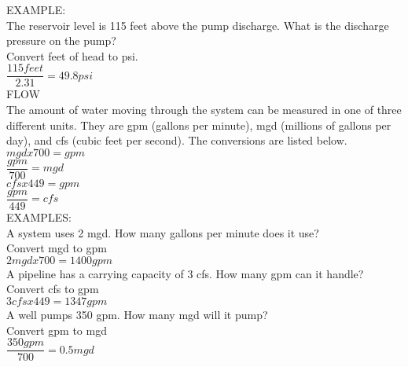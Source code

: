 \documentclass{article}
\begin{document}
EXAMPLE:\\
The reservoir level is 115 feet above the pump discharge. What is the discharge pressure on the pump?\\
Convert feet of head to psi.\\
$\dfrac{115 feet}{2.31} = 49.8 psi$\\


FLOW\\
The amount of water moving through the system can be measured in one of three different units. They are gpm (gallons per minute), mgd (millions of gallons per day), and cfs (cubic feet per second). The conversions are listed below.\\
$mgd x 700 = gpm $\\
$\dfrac{gpm}{700} = mgd$\\
$cfs x 449 = gpm $\\
$\dfrac{gpm }{449}= cfs$\\
EXAMPLES:\\
A system uses 2 mgd. How many gallons per minute does it use?\\
Convert mgd to gpm\\
$2 mgd x 700 = 1400 gpm$\\
A pipeline has a carrying capacity of 3 cfs. How many gpm can it handle?\\
Convert cfs to gpm\\
$3 cfs x 449 = 1347 gpm$\\
A well pumps 350 gpm. How many mgd will it pump?\\
Convert gpm to mgd\\
$\dfrac{350 gpm}{700} = 0.5 mgd$\\
\end{document}
